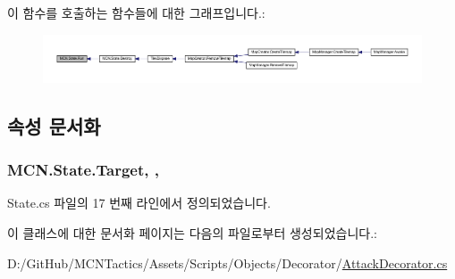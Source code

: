 이 함수를 호출하는 함수들에 대한 그래프입니다.\+:\nopagebreak
\begin{figure}[H]
\begin{center}
\leavevmode
\includegraphics[width=350pt]{class_m_c_n_1_1_state_afdec72a816a8a8ec584cac758a027215_icgraph}
\end{center}
\end{figure}




\subsection{속성 문서화}
\subsubsection[{\texorpdfstring{Target}{Target}}]{ M\+C\+N.\+State.\+Target\hspace{0.3cm}{\ttfamily [get]}, {\ttfamily [protected]}, {\ttfamily [inherited]}}\hypertarget{class_m_c_n_1_1_state_a79a563b32f183c9adc9a96679fc57eb8}{}\label{class_m_c_n_1_1_state_a79a563b32f183c9adc9a96679fc57eb8}


State.\+cs 파일의 17 번째 라인에서 정의되었습니다.



이 클래스에 대한 문서화 페이지는 다음의 파일로부터 생성되었습니다.\+:\begin{DoxyCompactItemize}
\item 
D\+:/\+Git\+Hub/\+M\+C\+N\+Tactics/\+Assets/\+Scripts/\+Objects/\+Decorator/\hyperlink{_attack_decorator_8cs}{Attack\+Decorator.\+cs}\end{DoxyCompactItemize}
